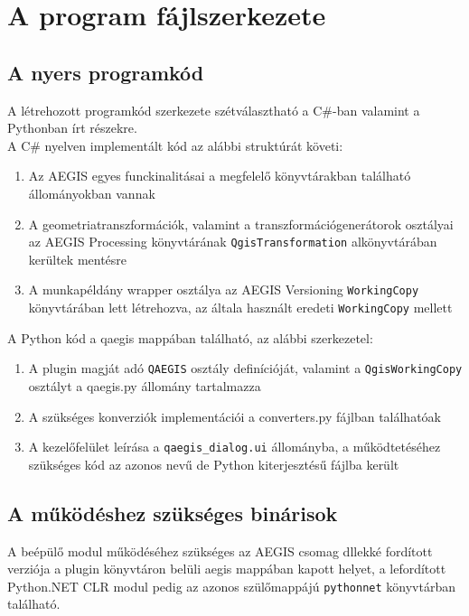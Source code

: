 \section{A program fájlszerkezete}
\subsection{A nyers programkód}
A létrehozott programkód szerkezete szétválasztható a C\#-ban valamint a Pythonban írt részekre.\\
A C\# nyelven implementált kód az alábbi struktúrát követi:
\begin{enumerate}
	\item Az AEGIS egyes funckinalitásai a megfelelő könyvtárakban található állományokban vannak
	\item A geometriatranszformációk, valamint a transzformációgenerátorok osztályai az AEGIS Processing könyvtárának \texttt{QgisTransformation} alkönyvtárában kerültek mentésre
	\item A munkapéldány wrapper osztálya az AEGIS Versioning \texttt{WorkingCopy} könyvtárában lett létrehozva, az általa használt eredeti \texttt{WorkingCopy} mellett 
\end{enumerate}
A Python kód a qaegis mappában található, az alábbi szerkezetel:
\begin{enumerate}
	\item A plugin magját adó \texttt{QAEGIS} osztály definícióját, valamint a \texttt{QgisWorkingCopy} osztályt a qaegis.py állomány tartalmazza
	\item A szükséges konverziók implementációi a converters.py fájlban találhatóak
	\item A kezelőfelület leírása a \texttt{qaegis\_dialog.ui} állományba, a működtetéséhez szükséges kód az azonos nevű de Python kiterjesztésű fájlba került
\end{enumerate}
\subsection{A működéshez szükséges binárisok}
A beépülő modul működéséhez szükséges az AEGIS csomag dllekké fordított verziója a plugin könyvtáron belüli aegis mappában kapott helyet, a lefordított Python.NET CLR modul pedig az azonos szülőmappájú \texttt{pythonnet} könyvtárban található.

